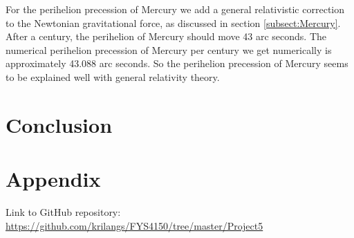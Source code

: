 \documentclass[12pt,a4paper,english]{article}
\begin{document}
For the perihelion precession of Mercury we add a general relativistic correction to the Newtonian gravitational force, as discussed in section \ref{subsect:Mercury}. After a century, the perihelion of Mercury should move 43 arc seconds. The numerical perihelion precession of Mercury per century we get numerically is approximately 43.088 arc seconds. So the perihelion precession of Mercury seems to be explained well with general relativity theory.

\section{Conclusion}
\label{sect:Conclusion}

\appendix
\section{Appendix}
\label{sect:appendix}
Link to GitHub repository:\\
\url{https://github.com/krilangs/FYS4150/tree/master/Project5}



\end{document}
